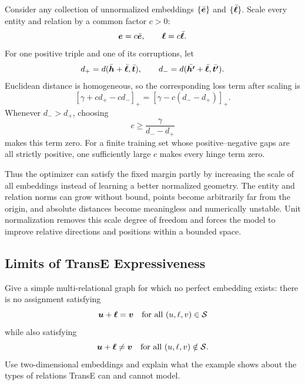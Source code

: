 \begin{solution}
Consider any collection of unnormalized embeddings
\(\{\bar{\bm{e}}\}\) and \(\{\bar{\bm{\ell}}\}\).  Scale every entity and
relation by a common factor \(c>0\):
\[
  \bm{e}=c\bar{\bm{e}},
  \qquad
  \bm{\ell}=c\bar{\bm{\ell}}.
\]
For one positive triple and one of its corruptions, let
\[
  d_+
  =d(\bar{\bm{h}}+\bar{\bm{\ell}},\bar{\bm{t}}),
  \qquad
  d_-
  =d(\bar{\bm{h'}}+\bar{\bm{\ell}},\bar{\bm{t'}}).
\]
Euclidean distance is homogeneous, so the corresponding loss term after
scaling is
\[
  [\gamma+c d_+-c d_-]_+
  =
  [\gamma-c(d_--d_+)]_+.
\]
Whenever \(d_->d_+\), choosing
\[
  c\geq \frac{\gamma}{d_--d_+}
\]
makes this term zero.  For a finite training set whose positive--negative
gaps are all strictly positive, one sufficiently large \(c\) makes every
hinge term zero.

Thus the optimizer can satisfy the fixed margin partly by increasing the
scale of all embeddings instead of learning a better normalized geometry.
The entity and relation norms can grow without bound, points become
arbitrarily far from the origin, and absolute distances become meaningless
and numerically unstable.  Unit normalization removes this scale degree of
freedom and forces the model to improve relative directions and positions
within a bounded space.
\end{solution}

\subsection{Limits of TransE Expressiveness}

Give a simple multi-relational graph for which no perfect embedding exists:
there is no assignment satisfying
\[
  \bm{u}+\bm{\ell}=\bm{v}
  \quad\text{for all }(u,\ell,v)\in\mathcal S
\]
while also satisfying
\[
  \bm{u}+\bm{\ell}\ne\bm{v}
  \quad\text{for all }(u,\ell,v)\notin\mathcal S.
\]
Use two-dimensional embeddings and explain what the example shows about the
types of relations TransE can and cannot model.

